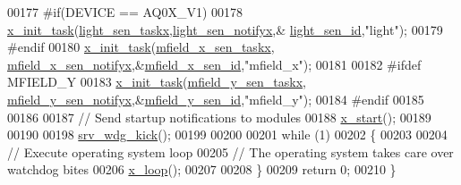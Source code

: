 \begin{DoxyCode}
00177 \textcolor{preprocessor}{    #if(DEVICE == AQ0X\_V1)}
00178     \hyperlink{a00036_a1e79db5ed3ab326586129eb4d7b63d46}{x\_init\_task}(\hyperlink{a00018_ae9aa2f8b8e90a92755efbcd161c67bc0}{light\_sen\_taskx},\hyperlink{a00018_a317b03892739257278fd51ab8003962d}{light\_sen\_notifyx},&
      \hyperlink{a00018_a757e7771170ace1d9f8519bd318ec64a}{light\_sen\_id},\textcolor{stringliteral}{"light"});
00179 \textcolor{preprocessor}{    #endif}
00180     \hyperlink{a00036_a1e79db5ed3ab326586129eb4d7b63d46}{x\_init\_task}(\hyperlink{a00019_a72e9235043dc4a8469143a6eb48bf117}{mfield\_x\_sen\_taskx},
      \hyperlink{a00019_ac28a2b5f3fa92c0593446e15a63a501c}{mfield\_x\_sen\_notifyx},&\hyperlink{a00019_a19a33e680bf19d1aed76750132ed8b64}{mfield\_x\_sen\_id},\textcolor{stringliteral}{"mfield\_x"});
00181      
00182 \textcolor{preprocessor}{#ifdef MFIELD\_Y}
00183     \hyperlink{a00036_a1e79db5ed3ab326586129eb4d7b63d46}{x\_init\_task}(\hyperlink{a00019_adfb4e8d328a4cd1c7639082bef5841a9}{mfield\_y\_sen\_taskx},
      \hyperlink{a00019_a80b82366f7d22e925f279d20328f05c8}{mfield\_y\_sen\_notifyx},&\hyperlink{a00019_a99c4ad3cf8b9ce2b67351d6edf48f937}{mfield\_y\_sen\_id},\textcolor{stringliteral}{"mfield\_y"});
00184 \textcolor{preprocessor}{#endif}
00185    
00186    
00187     \textcolor{comment}{// Send startup notifications to modules}
00188     \hyperlink{a00036_aea907663ecaf77bacfb9f0bfdc11f900}{x\_start}();        
00189 
00190      
00198     \hyperlink{a00067_a710d148845397582739d170341f3d3d9}{srv\_wdg\_kick}();
00199 
00200 
00201     \textcolor{keywordflow}{while} (1)             
00202     \{
00203          
00204         \textcolor{comment}{// Execute operating system loop}
00205         \textcolor{comment}{// The operating system takes care over watchdog bites}
00206         \hyperlink{a00036_a4bb7a012be733e061c913e7b98df642b}{x\_loop}();
00207 
00208     \}
00209     \textcolor{keywordflow}{return} 0;             
00210 \}
\end{DoxyCode}


